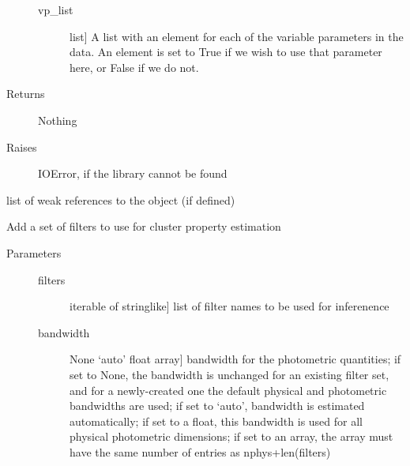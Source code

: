 \documentclass[letterpaper,10pt,english]{sphinxmanual}
\begin{document}
\begin{fulllineitems}
\begin{fulllineitems}
\begin{description}
\begin{description}
\item[{vp\_list}] \leavevmode{[}list{]}
A list with an element for each of the variable parameters
in the data. An element is set to True if we wish to use
that parameter here, or False if we do not.

\end{description}

\item[{Returns}] \leavevmode
Nothing

\item[{Raises}] \leavevmode
IOError, if the library cannot be found

\end{description}

\end{fulllineitems}


\begin{fulllineitems}
\label{cluster_slug:slugpy.cluster_slug.cluster_slug.__weakref__}
list of weak references to the object (if defined)

\end{fulllineitems}


\begin{fulllineitems}
\label{cluster_slug:slugpy.cluster_slug.cluster_slug.add_filters}
Add a set of filters to use for cluster property estimation
\begin{description}
\item[{Parameters}] \leavevmode\begin{description}
\item[{filters}] \leavevmode{[}iterable of stringlike{]}
list of filter names to be used for inferenence

\item[{bandwidth}] \leavevmode{[}None \textbar{} `auto' \textbar{} float \textbar{} array{]}
bandwidth for the photometric quantities; if set to
None, the bandwidth is unchanged for an existing filter
set, and for a newly-created one the default physical
and photometric bandwidths are used; if set to `auto',
bandwidth is estimated automatically; if set to a float,
this bandwidth is used for all physical photometric
dimensions; if set to an array, the array must have the
same number of entries as nphys+len(filters)


\end{description}
\end{description}
\end{fulllineitems}
\end{fulllineitems}
\end{document}
